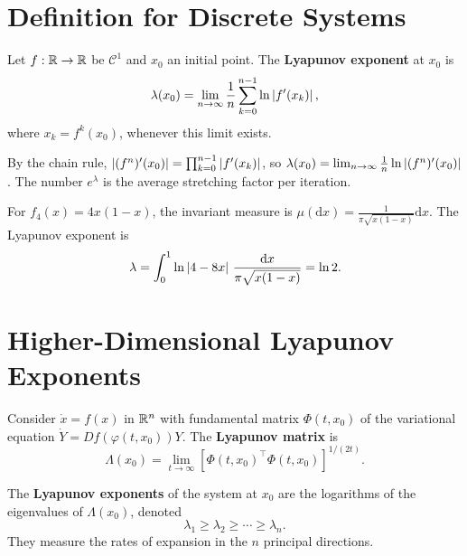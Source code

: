 \section{Definition for Discrete Systems}

\begin{definition}
\label{def:lyap-1d}
Let $f : \mathbb{R} \to \mathbb{R}$ be $\mathcal{C}^1$ and $x_0$ an initial point. The
\textbf{Lyapunov exponent} at $x_0$ is
\[
    \lambda(x_0) = \lim_{n \to \infty} \frac{1}{n}
    \sum_{k=0}^{n-1} \ln \left| f'(x_k) \right|,
\]
where $x_k = f^k(x_0)$, whenever this limit exists.
\end{definition}

\begin{remark}
By the chain rule, $\left| (f^n)'(x_0) \right| = \prod_{k=0}^{n-1}\left| f'(x_k) \right|$,
so $\lambda(x_0) = \lim_{n \to \infty} \frac{1}{n}\ln\left| (f^n)'(x_0) \right|$.
The number $e^\lambda$ is the average stretching factor per iteration.
\end{remark}

\begin{example}
For $f_4(x) = 4x(1-x)$, the invariant measure is
$\mu(\mathrm{d}x) = \frac{1}{\pi\sqrt{x(1-x)}}\mathrm{d}x$. The Lyapunov
exponent is
\[
    \lambda = \int_0^1 \ln\left| 4 - 8x \right|\,\frac{\mathrm{d}x}{\pi\sqrt{x(1-x)}}
    = \ln 2.
\]
\end{example}

\section{Higher-Dimensional Lyapunov Exponents}

\begin{definition}
Consider $\dot{x} = f(x)$ in $\mathbb{R}^n$ with fundamental matrix $\Phi(t, x_0)$
of the variational equation $\dot{Y} = Df(\varphi(t, x_0))Y$. The
\textbf{Lyapunov matrix} is
\[
    \Lambda(x_0) = \lim_{t \to \infty}
    \left[\Phi(t, x_0)^\top \Phi(t, x_0)\right]^{1/(2t)}.
\]
\end{definition}

\begin{definition}
The \textbf{Lyapunov exponents} of the system at $x_0$ are the logarithms of
the eigenvalues of $\Lambda(x_0)$, denoted
\[
    \lambda_1 \geq \lambda_2 \geq \cdots \geq \lambda_n.
\]
They measure the rates of expansion in the $n$ principal directions.
\end{definition}

